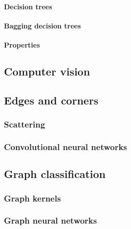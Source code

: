             \paragraph{Decision trees}
            \paragraph{Bagging decision trees}
            \paragraph{Properties}
    \subsection{Computer vision}
        \subsection{Edges and corners}
        \subsubsection{Scattering}
        \subsubsection{Convolutional neural networks}
    \subsection{Graph classification}
        \subsubsection{Graph kernels}
        \subsubsection{Graph neural networks}
